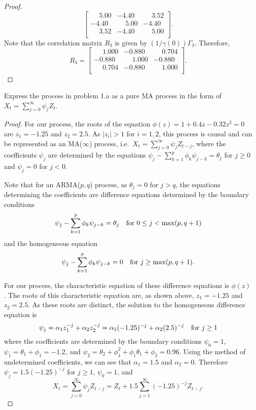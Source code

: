 \documentclass[12pt]{article}
\theoremstyle{definition}
\newenvironment{custompbm}[1]
  {\renewcommand\theproblem{#1}\problem}
  {\endproblem}
\begin{document}
\begin{proof}
\[\begin{bmatrix}
      \phantom{-}5.00  & -4.40 & \phantom{-}3.52 \\
      -4.40 & \phantom{-}5.00  & -4.40  \\
      \phantom{-}3.52 & -4.40 & \phantom{-}5.00  \\
    \end{bmatrix}.
  \]
  Note that the correlation matrix $R_3$ is given by $(1/\gamma(0))\Gamma_3$. Therefore,
  \[
    R_3 =
    \begin{bmatrix}
      \phantom{-}1.000  & -0.880 & \phantom{-}0.704 \\
      -0.880 & \phantom{-}1.000  & -0.880  \\
      \phantom{-}0.704 & -0.880 & \phantom{-}1.000  \\
    \end{bmatrix}.
  \]

\end{proof}


\begin{custompbm}{1.c}
  Express the process in problem 1.a as a pure MA process in the form of $X_t = \sum_{j=0}^\infty\psi_jZ_t$.
\end{custompbm}

\begin{proof}
  For our process, the roots of the equation $\phi(z) = 1 + 0.4 z - 0.32 z^2 = 0$ are
  $z_1 = -1.25$ and $z_2 = 2.5$. As $|z_i| > 1$ for $i=1,2$, this process is causal and
  can be represented as an MA($\infty$) process, i.e.\ $X_t = \sum_{j=0}^\infty \psi_j Z_{t-j}$,
  where the coefficients $\psi_j$ are determined by the equations $\psi_j - \sum_{k=1}^p \phi_k\psi_{j-k} = \theta_j$
  for $j \geq 0$ and $\psi_j = 0$ for $j < 0$.

  Note that for an ARMA($p, q$) process, as $\theta_j = 0$ for $j > q$, the equations
  determining the coefficients are difference equations determined by the boundary conditions
  \[
    \psi_j - \sum_{k=1}^p \phi_k \psi_{j-k} = \theta_j \text{\quad \text{for $0 \leq j < \max(p, q+1)$}}
  \]
  and the homogeneous equation
  \[
    \psi_j - \sum_{k=1}^p \phi_k \psi_{j-k} = 0 \text{\quad \text{for $j \geq \max(p, q+1)$}}.
  \]

  For our process, the characteristic equation of these difference equations is $\phi(z)$. The roots
  of this characteristic equation are, as shown above, $z_1 = -1.25$ and $z_2 = 2.5$. As these roots
  are distinct, the solution to the homogeneous difference equation is
  \[
    \psi_j = \alpha_1 z_1 ^ {-j} + \alpha_2 z_2 ^{-j} = \alpha_1 (-1.25)^{-j} + \alpha_2 (2.5)^{-j} \text{\quad for $j \geq 1$}
  \]
  where the coefficients are determined by the boundary conditions $\psi_0 = 1$,
  $\psi_1 = \theta_1 + \phi_1 = -1.2$, and $\psi_2 = \theta_2 + \phi_1^2 + \phi_1\theta_1 + \phi_2 = 0.96$.
  Using the method of undetermined coefficients, we can see that $\alpha_1 = 1.5$ and $\alpha_2 = 0$.
  Therefore $\psi_j = 1.5(-1.25)^{-j}$ for $j \geq 1$, $\psi_0 = 1$, and
  \[
    X_t = \sum_{j=0}^\infty\psi_j Z_{t-j} = Z_t + 1.5 \sum_{j=1}^\infty (-1.25)^{-j}Z_{t-j}.
  \]
\end{proof}
\end{document}

